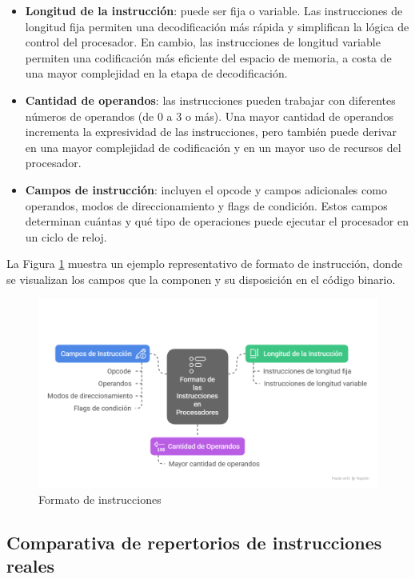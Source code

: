 \documentclass[12pt,oneside]{templates/unerthesis}
\providecommand{\tightlist}{%
  \setlength{\itemsep}{0pt}\setlength{\parskip}{0pt}}
\begin{document}
\begin{itemize}
\tightlist
\item
  \textbf{Longitud de la instrucción}: puede ser fija o variable. Las instrucciones de longitud fija permiten una decodificación más rápida y simplifican la lógica de control del procesador. En cambio, las instrucciones de longitud variable permiten una codificación más eficiente del espacio de memoria, a costa de una mayor complejidad en la etapa de decodificación.
\item
  \textbf{Cantidad de operandos}: las instrucciones pueden trabajar con diferentes números de operandos (de 0 a 3 o más). Una mayor cantidad de operandos incrementa la expresividad de las instrucciones, pero también puede derivar en una mayor complejidad de codificación y en un mayor uso de recursos del procesador.
\item
  \textbf{Campos de instrucción}: incluyen el opcode y campos adicionales como operandos, modos de direccionamiento y flags de condición. Estos campos determinan cuántas y qué tipo de operaciones puede ejecutar el procesador en un ciclo de reloj.
\end{itemize}

La Figura \ref{fig:forminst} muestra un ejemplo representativo de formato de instrucción, donde se visualizan los campos que la componen y su disposición en el código binario.

\begin{figure}

{\centering \includegraphics[width=1\linewidth]{images/formatoinst} 

}

\caption{Formato de instrucciones }\label{fig:forminst}
\end{figure}

\hypertarget{comparativa-de-repertorios-de-instrucciones-reales}{%
\subsection{Comparativa de repertorios de instrucciones reales}\label{comparativa-de-repertorios-de-instrucciones-reales}}
\end{document}
